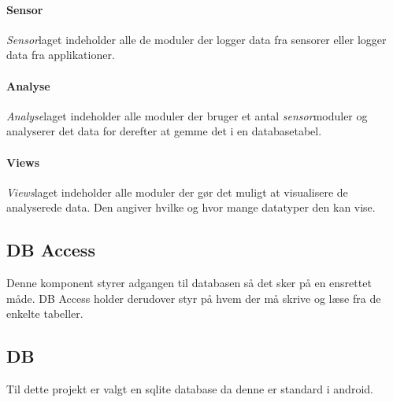\paragraph{Sensor} \textit{Sensor}laget indeholder alle de moduler der logger data fra sensorer eller logger data fra applikationer.

\paragraph{Analyse}
\textit{Analyse}laget indeholder alle moduler der bruger et antal \textit{sensor}moduler og analyserer det data for derefter at gemme det i en databasetabel.

\paragraph{Views}
\textit{Views}laget indeholder alle moduler der gør det muligt at visualisere de analyserede data.
Den angiver hvilke og hvor mange datatyper den kan vise.

\subsection*{DB Access}
Denne komponent styrer adgangen til databasen så det sker på en ensrettet måde.
DB Access holder derudover styr på hvem der må skrive og læse fra de enkelte tabeller.

\subsection*{DB}
Til dette projekt er valgt en sqlite database da denne er standard i android.